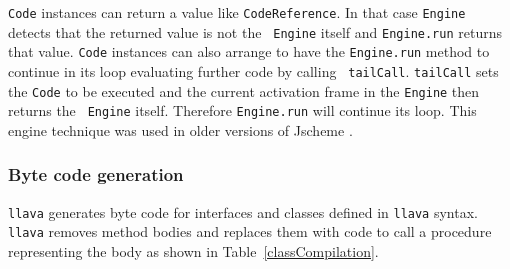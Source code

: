 \documentclass{acm_proc_article-sp}
\begin{document}
{\tt Code} instances can return a value like {\tt CodeReference}.  In
that case {\tt Engine} detects that the returned value is not the {\tt
Engine} itself and {\tt Engine.run} returns that value.  {\tt Code}
instances can also arrange to have the {\tt Engine.run} method to
continue in its loop evaluating further code by calling {\tt
tailCall}.  {\tt tailCall} sets the {\tt Code} to be executed and the
current activation frame in the {\tt Engine} then returns the {\tt
Engine} itself.  Therefore {\tt Engine.run} will continue its loop.
This engine technique was used in older versions of Jscheme
\cite{JschemeEngine}.

\subsubsection{Byte code generation}

{\tt llava} generates byte code for interfaces and classes defined in
{\tt llava} syntax.  {\tt llava} removes method bodies and replaces
them with code to call a procedure representing the body as shown in
Table~\ref{classCompilation}.
\end{document}
